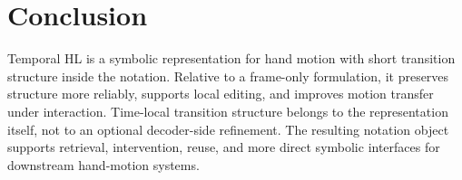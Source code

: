 \documentclass[letterpaper]{article}
\newcommand{\thl}{Temporal HL}
\begin{document}
\section{Conclusion}

\thl{} is a symbolic representation for hand motion with short transition
structure inside the notation. Relative to a frame-only formulation, it
preserves structure more reliably, supports local editing, and improves motion
transfer under interaction. Time-local transition structure belongs to the
representation itself, not to an optional decoder-side refinement. The
resulting notation object supports retrieval, intervention, reuse, and more
direct symbolic interfaces for downstream hand-motion systems.


\end{document}
